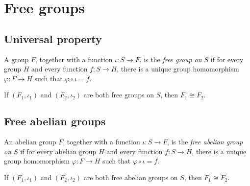 \section{Free groups}
\label{sec:groups:free-groups}

\subsection{Universal property}
\label{subsec:groups:free-groups-universal-property}

\begin{definition}
  \label{def:groups:is-free-group-on}
  \leanok
  A group $F$, together with a function $\iota : S \to F$, is the
  \emph{free group on $S$} if for every group $H$ and every function
  $f : S \to H$, there is a unique group homomorphism $\varphi : F
  \to H$ such that $\varphi \circ \iota = f$.
\end{definition}

\begin{proposition}
  \label{prop:groups:free-group-unique}
  If $(F_1, \iota_1)$ and $(F_2, \iota_2)$ are both free groups on
  $S$, then $F_1 \cong F_2$.
\end{proposition}

\subsection{Free abelian groups}
\label{subsec:groups:free-abelian-groups}

\begin{definition}
  \label{def:groups:is-free-abelian-group-on}
  \leanok
  An abelian group $F$, together with a function $\iota : S \to F$,
  is the \emph{free abelian group on $S$} if for every abelian group
  $H$ and every function $f : S \to H$, there is a unique group
  homomorphism $\varphi : F \to H$ such that $\varphi \circ \iota =
  f$.
\end{definition}

\begin{proposition}
  \label{prop:groups:free-abelian-group-unique}
  If $(F_1, \iota_1)$ and $(F_2, \iota_2)$ are both free abelian
  groups on $S$, then $F_1 \cong F_2$.
\end{proposition}

